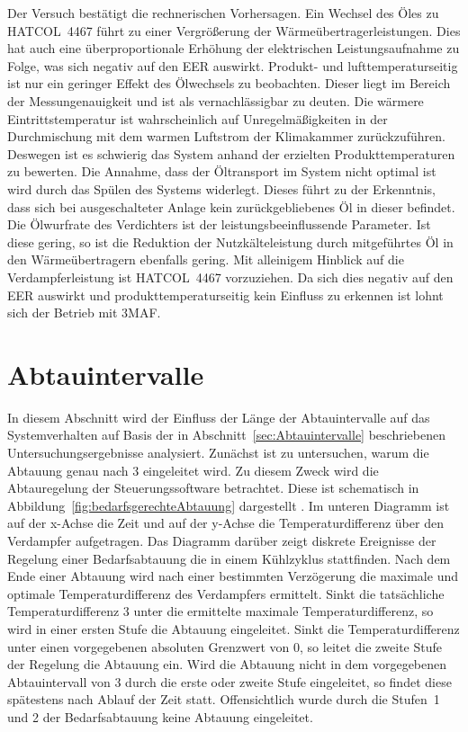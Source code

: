 Der Versuch bestätigt die rechnerischen Vorhersagen. Ein Wechsel des Öles zu HATCOL~4467 führt zu einer Vergrößerung der Wärmeübertragerleistungen. Dies hat auch eine überproportionale Erhöhung der elektrischen Leistungsaufnahme zu Folge, was sich negativ auf den EER auswirkt.
Produkt- und lufttemperaturseitig ist nur ein geringer Effekt des Ölwechsels zu beobachten. Dieser liegt im Bereich der Messungenauigkeit und ist als vernachlässigbar zu deuten. Die wärmere Eintrittstemperatur ist wahrscheinlich auf Unregelmäßigkeiten in der Durchmischung mit dem warmen Luftstrom der Klimakammer zurückzuführen. Deswegen ist es schwierig das System anhand der erzielten Produkttemperaturen zu bewerten.
Die Annahme, dass der Öltransport im System nicht optimal ist wird durch das Spülen des Systems widerlegt. Dieses führt zu der Erkenntnis, dass sich bei ausgeschalteter Anlage kein zurückgebliebenes Öl in dieser befindet. Die Ölwurfrate des Verdichters ist der leistungsbeeinflussende Parameter. Ist diese gering, so ist die Reduktion der Nutzkälteleistung durch mitgeführtes Öl in den Wärmeübertragern ebenfalls gering. \newline
Mit alleinigem Hinblick auf die Verdampferleistung ist HATCOL~4467 vorzuziehen.
Da sich dies negativ auf den EER auswirkt und produkttemperaturseitig kein Einfluss zu erkennen ist lohnt sich der Betrieb mit 3MAF.





\clearpage


\section{Abtauintervalle}
\label{sec:AbtauintervalleAnalyse}

In diesem Abschnitt wird der Einfluss der Länge der Abtauintervalle auf das Systemverhalten auf Basis der in Abschnitt~\ref{sec:Abtauintervalle} beschriebenen Untersuchungsergebnisse analysiert. \newline
Zunächst ist zu untersuchen, warum die Abtauung genau nach \unit{3}{\hour} eingeleitet wird. Zu diesem Zweck wird die Abtauregelung der Steuerungssoftware betrachtet. Diese ist schematisch in Abbildung~\ref{fig:bedarfsgerechteAbtauung} dargestellt \cite{EmersonClimateTechnologies.2017}. Im unteren Diagramm ist auf der x-Achse die Zeit und auf der y-Achse die Temperaturdifferenz über den Verdampfer aufgetragen. Das Diagramm darüber zeigt diskrete Ereignisse  der Regelung einer Bedarfsabtauung die in einem Kühlzyklus stattfinden.
Nach dem Ende einer Abtauung wird nach einer bestimmten Verzögerung die maximale und optimale Temperaturdifferenz des Verdampfers ermittelt. Sinkt die tatsächliche Temperaturdifferenz \unit{3}{\kelvin} unter die ermittelte maximale Temperaturdifferenz, so wird in einer ersten Stufe die Abtauung eingeleitet. Sinkt die Temperaturdifferenz unter einen vorgegebenen absoluten Grenzwert von \unit{0}{\kelvin}, so leitet die zweite Stufe der Regelung die Abtauung ein. Wird die Abtauung nicht in dem vorgegebenen Abtauintervall von \unit{3}{\hour} durch die erste oder zweite Stufe eingeleitet, so findet diese spätestens nach Ablauf der Zeit statt. Offensichtlich wurde durch die Stufen~1 und 2 der Bedarfsabtauung keine Abtauung eingeleitet. 

